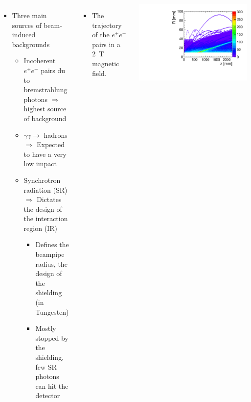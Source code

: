 \documentclass[final,xcolor={dvipsnames,svgnames,x11names,table}]{beamer}
\begin{document}
\begin{frame}
\begin{textblock}{40}
\begin{tcolorbox}[title=Main sources of beam-induced backgrounds]
  \begin{columns}
    \begin{itemize}
      \item Three main sources of beam-induced backgrounds
      \begin{itemize}
        \item Incoherent $e^+e^-$ pairs du to bremstrahlung photons $\Rightarrow$ highest source of background
        \item $\gamma\gamma\rightarrow$ hadrons $\Rightarrow$ Expected to have a very low impact
        \item Synchrotron radiation (SR) $\Rightarrow$ Dictates the design of the interaction region (IR)
          \begin{itemize}
            \item Defines the beampipe radius, the design of the shielding (in Tungesten)
            \item Mostly stopped by the shielding, few SR photons can hit the detector
          \end{itemize}
      \end{itemize}
    \end{itemize}

    \begin{itemize}
      \item The trajectory of the $e^+e^−$ pairs in a 2~T magnetic field.
    \end{itemize}
    \centering
    \includegraphics[width=\textwidth]{../figures/pairs_R_Z}
  \end{columns}


\end{tcolorbox}
\end{textblock}
\end{frame}
\end{document}
